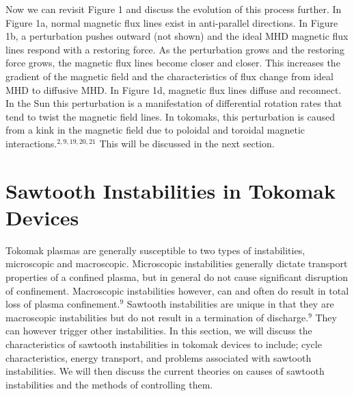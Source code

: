 \documentclass{article}
\begin{document}
Now we can revisit Figure 1 and discuss the evolution of this process further.  In Figure 1a, normal magnetic flux lines exist in anti-parallel directions.  In Figure 1b, a perturbation pushes outward (not shown) and the ideal MHD magnetic flux lines respond with a restoring force.  As the perturbation grows and the restoring force grows, the magnetic flux lines become closer and closer.  This increases the gradient of the magnetic field and the characteristics of flux change from ideal MHD to diffusive MHD.  In Figure 1d, magnetic flux lines diffuse and reconnect.  In the Sun this perturbation is a manifestation of differential rotation rates that tend to twist the magnetic field lines.  In tokomaks, this perturbation is caused from a kink in the magnetic field due to poloidal and toroidal magnetic interactions.$^{2,9,19,20,21}$  This will be discussed in the next section.
\section{Sawtooth Instabilities in Tokomak Devices}
Tokomak plasmas are generally susceptible to two types of instabilities, microscopic and macroscopic.  Microscopic instabilities generally dictate transport properties of a confined plasma, but in general do not cause significant disruption of confinement.  Macroscopic instabilities however, can and often do result in total loss of plasma confinement.$^{9}$  Sawtooth instabilities are unique in that they are macroscopic instabilities but do not result in a termination of discharge.$^{9}$  They can however trigger other instabilities.  In this section, we will discuss the characteristics of sawtooth instabilities in tokomak devices to include; cycle characteristics, energy transport, and problems associated with sawtooth instabilities.  We will then discuss the current theories on causes of sawtooth instabilities and the methods of controlling them.
\end{document}
